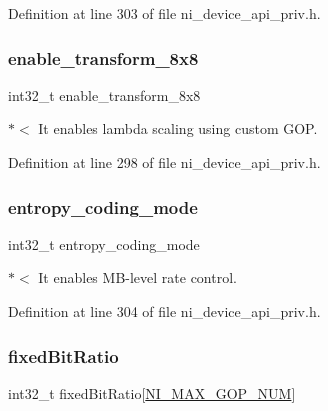 Definition at line 303 of file ni\+\_\+device\+\_\+api\+\_\+priv.\+h.

\mbox{\label{struct__ni__t408__config__t_a9a7bf588d05dcf940cd2325f80a9299a}} 
\subsubsection{\texorpdfstring{enable\_transform\_8x8}{enable\_transform\_8x8}}
{\footnotesize\ttfamily int32\+\_\+t enable\+\_\+transform\+\_\+8x8}

$\ast$$<$ It enables lambda scaling using custom G\+OP. 

Definition at line 298 of file ni\+\_\+device\+\_\+api\+\_\+priv.\+h.

\mbox{\label{struct__ni__t408__config__t_a9bff635a96d4be296181ed1bd611b683}} 
\subsubsection{\texorpdfstring{entropy\_coding\_mode}{entropy\_coding\_mode}}
{\footnotesize\ttfamily int32\+\_\+t entropy\+\_\+coding\+\_\+mode}

$\ast$$<$ It enables M\+B-\/level rate control. 

Definition at line 304 of file ni\+\_\+device\+\_\+api\+\_\+priv.\+h.

\mbox{\label{struct__ni__t408__config__t_a353df24b5bd189d29cd18a776dbda11d}} 
\subsubsection{\texorpdfstring{fixedBitRatio}{fixedBitRatio}}
{\footnotesize\ttfamily int32\+\_\+t fixed\+Bit\+Ratio\mbox{[}\mbox{\hyperlink{ni__device__api_8h_a4fdb37034e4182c47a5c5e46a1385ff0}{N\+I\+\_\+\+M\+A\+X\+\_\+\+G\+O\+P\+\_\+\+N\+UM}}\mbox{]}}



